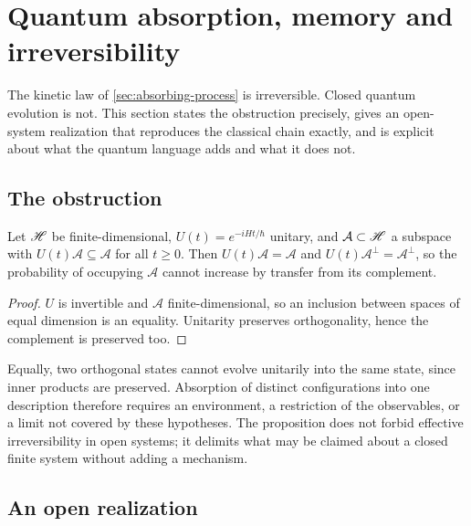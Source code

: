 \section{Quantum absorption, memory and irreversibility}\label{sec:quantum}

The kinetic law of \cref{sec:absorbing-process} is irreversible. Closed
quantum evolution is not. This section states the obstruction precisely, gives
an open-system realization that reproduces the classical chain exactly, and is
explicit about what the quantum language adds and what it does not.

\subsection{The obstruction}\label{sec:quantum-obstruction}

\begin{proposition}\label{prop:unitary-obstruction}
  Let $\mathscr{H}$ be finite-dimensional, $U(t)=e^{-iHt/\hbar}$ unitary, and
  $\mathcal A\subset\mathscr{H}$ a subspace with $U(t)\mathcal A\subseteq\mathcal A$
  for all $t\ge0$. Then $U(t)\mathcal A=\mathcal A$ and
  $U(t)\mathcal A^{\perp}=\mathcal A^{\perp}$, so the probability of occupying
  $\mathcal A$ cannot increase by transfer from its complement.
\end{proposition}

\begin{proof}
  $U$ is invertible and $\mathcal A$ finite-dimensional, so an inclusion
  between spaces of equal dimension is an equality. Unitarity preserves
  orthogonality, hence the complement is preserved too.
\end{proof}

Equally, two orthogonal states cannot evolve unitarily into the same state,
since inner products are preserved. Absorption of distinct configurations into
one description therefore requires an environment, a restriction of the
observables, or a limit not covered by these hypotheses. The proposition does
not forbid effective irreversibility in open systems; it delimits what may be
claimed about a closed finite system without adding a mechanism.

\subsection{An open realization}\label{sec:quantum-lindblad}

